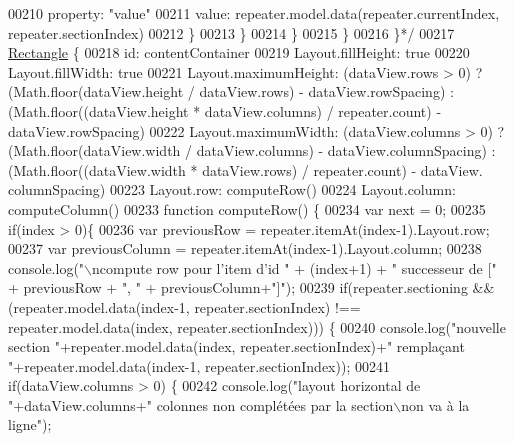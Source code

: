 \begin{DoxyCode}
{00210 \textcolor{comment}{                                property: "value"}
00211 \textcolor{comment}{                                value: repeater.model.data(repeater.currentIndex, repeater.sectionIndex)}
00212 \textcolor{comment}{                            \}}
00213 \textcolor{comment}{                        \}}
00214 \textcolor{comment}{                    \}}
00215 \textcolor{comment}{                \}}
00216 \textcolor{comment}{            \}*/}
00217         \hyperlink{classRectangle}{Rectangle} \{
00218             \textcolor{keywordtype}{id}: contentContainer
00219             Layout.fillHeight: \textcolor{keyword}{true}
00220             Layout.fillWidth: \textcolor{keyword}{true}
00221             Layout.maximumHeight: (dataView.rows > 0) ? (Math.floor(dataView.height / dataView.rows) - 
      dataView.rowSpacing) : (Math.floor((dataView.height * dataView.columns) / repeater.count) - dataView.rowSpacing)
00222             Layout.maximumWidth: (dataView.columns > 0) ? (Math.floor(dataView.width / dataView.columns) - 
      dataView.columnSpacing) : (Math.floor((dataView.width * dataView.rows) / repeater.count) - dataView.
      columnSpacing)
00223             Layout.row: computeRow()
00224             Layout.column: computeColumn()
00233             function computeRow() \{
00234                 var next = 0;
00235                 \textcolor{keywordflow}{if}(index > 0)\{
00236                     var previousRow = repeater.itemAt(index-1).Layout.row;
00237                     var previousColumn = repeater.itemAt(index-1).Layout.column;
00238                     console.log(\textcolor{stringliteral}{"\(\backslash\)ncompute row pour l'item  d'id "} + (index+1) + \textcolor{stringliteral}{" successeur de ["} + 
      previousRow + \textcolor{stringliteral}{", "} + previousColumn+\textcolor{stringliteral}{"]"});
00239                     \textcolor{keywordflow}{if}(repeater.sectioning && (repeater.model.data(index-1, repeater.sectionIndex) !== 
      repeater.model.data(index, repeater.sectionIndex))) \{
00240                         console.log(\textcolor{stringliteral}{"nouvelle section "}+repeater.model.data(index, repeater.sectionIndex)+\textcolor{stringliteral}{"
       remplaçant "}+repeater.model.data(index-1, repeater.sectionIndex));
00241                         \textcolor{keywordflow}{if}(dataView.columns > 0) \{
00242                             console.log(\textcolor{stringliteral}{"layout horizontal de "}+dataView.columns+\textcolor{stringliteral}{" colonnes non complétées
       par la section\(\backslash\)non va à la ligne"});
}
\end{DoxyCode}

